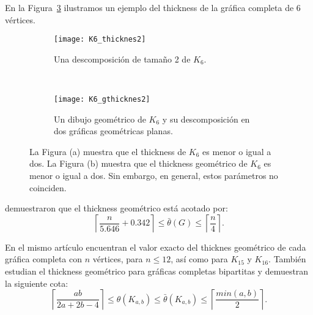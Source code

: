 En la Figura~\ref{fig:thicknessexample} ilustramos un ejemplo del thickness de
la gráfica completa de 6 vértices.
\begin{figure}[htb]
  \centering
\begin{subfigure}[h]{.5\textwidth}
  \centering
  \texttt{[image: K6\_thicknes2]}
  \caption{Una descomposición de tamaño 2 de $K_6$.}
  \label{fig:thk6}
\end{subfigure}%
\\
\begin{subfigure}[h]{.5\textwidth}
  \centering
  \texttt{[image: K6\_gthicknes2]}
  \caption{Un dibujo geométrico de $K_6$ y su descomposición
  en dos gráficas geométricas planas.}
  \label{fig:gthk6}
\end{subfigure}
\caption{La Figura (a) muestra que el thickness de $K_6$ es menor o igual a dos. La Figura (b) muestra que el thickness geométrico de $K_6$ es menor o igual a dos. Sin embargo, en general, estos parámetros no coinciden.}
\label{fig:thicknessexample}
\end{figure}




\cite{Dillencourt2004} demuestraron que el thickness geométrico está acotado por:
\[ \left\lceil \frac{n}{5.646} + 0.342 \right\rceil \leq  \bar{\theta}(G) \leq \left\lceil\frac{n}{4}\right\rceil .\]

En el mismo artículo encuentran el valor exacto del thicknes geométrico
de cada gráfica completa con $n$ vértices, para $n\leq 12$, así como para $K_{15}$ y $K_{16}$.
También estudian el thickness geométrico para gráficas completas bipartitas y demuestran la
siguiente cota:
\[
  \left\lceil \frac{ab}{2a+2b-4} \right\rceil \leq \theta(K_{a,b}) \leq \bar{\theta}(K_{a,b})
  \leq \left\lceil \frac{min(a,b)}{2} \right\rceil.
\]

